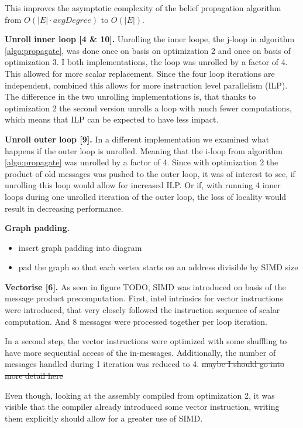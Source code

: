 \documentclass[letterpaper]{article}
\newcommand{\mypar}[1]{{\bf #1.}}
\begin{document}
This improves the asymptotic complexity of the belief propagation algorithm from $O(|E|\cdot avgDegree)$ to $O(|E|)$.

\mypar{Unroll inner loop [4 \& 10]}
Unrolling the inner loope, the j-loop in algorithm \ref{algo:propagate}, was done once on basis on optimization 2 and once on basis of optimization 3. I both implementations, the loop was unrolled by a factor of 4. This allowed for more scalar replacement. Since the four loop iterations are independent, combined this allows for more instruction level parallelism (ILP).
The difference in the two unrolling implementations is, that thanks to optimization 2 the second version unrolls a loop with much fewer computations, which means that ILP can be expected to have less impact.


\mypar{Unroll outer loop [9]}
In a different implementation we examined what happens if the outer loop is unrolled. Meaning that the i-loop from algorithm \ref{algo:propagate} was unrolled by a factor of 4. Since with optimization 2 the product of old messages was pushed to the outer loop, it was of interest to see, if unrolling this loop would allow for increased ILP. Or if, with running 4 inner loops during one unrolled iteration of the outer loop, the loss of locality would result in decreasing performance.

\mypar{Graph padding}
\begin{itemize}
\item insert graph padding into diagram
\item pad the graph so that each vertex starts on an address divisible by SIMD size
\end{itemize}


\mypar{Vectorise [6]}
As seen in figure TODO, SIMD was introduced on basis of the message product precomputation. First, intel intrinsics for vector instructions were introduced, that very closely followed the instruction sequence of scalar computation. And 8 messages were processed together per loop iteration.

In a second step, the vector instructions were optimized with some shuffling to have more sequential access of the in-messages. Additionally, the number of messages handled during 1 iteration was reduced to 4. \st{maybe I should go into more detail here}

Even though, looking at the assembly compiled from optimization 2, it was visible that the compiler already introduced some vector instruction, writing them explicitly should allow for a greater use of SIMD.
\end{document}

